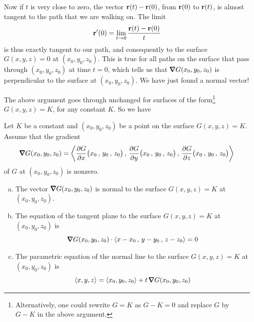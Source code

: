 Now if $t$ is very close to zero, the vector $\mathbf{r}(t)-\mathbf{r}(0)$, from
$\mathbf{r}(0)$ to $\mathbf{r}(t)$, is almost tangent to the path that we are walking on.
The limit 
\begin{equation*}
\mathbf{r}'(0)=\lim_{t\rightarrow 0}\frac{\mathbf{r}(t)-\mathbf{r}(0)}{t}
\end{equation*}
is thus exactly tangent to our path, and consequently to the surface
$G(x,y,z)=0$ at $(x_0,y_0,z_0)$. This is true for all paths on the surface that
pass through $(x_0,y_0,z_0)$ at time $t=0$, which tells us that
$\vnabla G(x_0,y_0,z_0)$ is perpendicular to the surface at $(x_0,y_0,z_0)$. 
We have just found a normal vector!

The above argument goes through unchanged for surfaces of 
the form\footnote{Alternatively, one could rewrite $G=K$ as $G-K=0$
and replace $G$ by $G-K$ in the above argument.}
$G(x,y,z)=K$, for any constant $K$. So we have

\begin{theorem}\label{thm tan plane G}
Let $K$ be a constant and $(x_0,y_0,z_0)$ be a point on the surface 
$G(x,y,z)=K$. Assume that the gradient 
\begin{equation*}
\vnabla G(x_0,y_0,z_0)
 = \llt \pdiff{G}{x}\big( x_0\,,\,y_0\,,\,z_0\big)\,,\,
     \pdiff{G}{y}\big( x_0\,,\,y_0\,,\,z_0\big)\,,\,
     \pdiff{G}{z}\big( x_0\,,\,y_0\,,\,z_0\big)\rgt
\end{equation*}
of $G$ at $(x_0,y_0,z_0)$ is nonzero.
\begin{enumerate}[(a)]
\item 
The vector $\vnabla G(x_0,y_0,z_0)$
is normal to the surface $G(x,y,z)=K$ at $(x_0,y_0,z_0)$.

\item
The equation of the tangent plane to the surface $G(x,y,z)=K$ 
at $(x_0,y_0,z_0)$ is
\begin{equation*}
\vnabla G(x_0,y_0,z_0)\cdot\llt x-x_0\,,\,y-y_0\,,\,z-z_0\rgt =0
\end{equation*}

\item
The parametric equation of the normal line to the surface $G(x,y,z)=K$ 
at $(x_0,y_0,z_0)$ is
\begin{equation*}
\llt x,y,z \rgt =  \llt x_0,y_0,z_0 \rgt
                 +t\,\vnabla G(x_0,y_0,z_0)
\end{equation*}
\end{enumerate}
\end{theorem}


